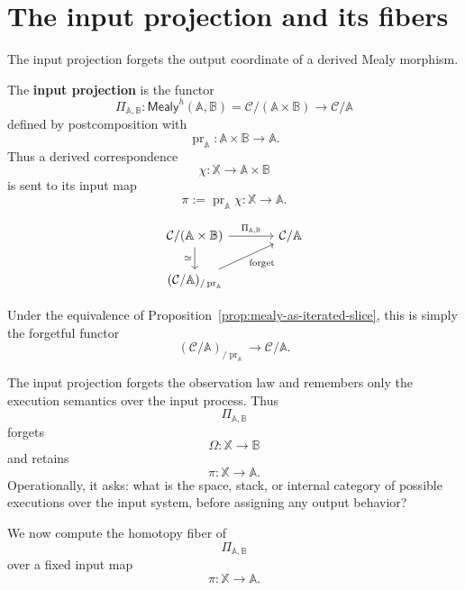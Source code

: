 \section{The input projection and its fibers}
\label{sec:input-projection-and-fiber-theorem-derived}

The input projection forgets the output coordinate of a derived Mealy
morphism.

\begin{definition}
\label{def:input-projection-derived-rewritten}
The \textbf{input projection} is the functor
\[
\Pi_{\mathbb A,\mathbb B}:
\mathsf{Mealy}^h(\mathbb A,\mathbb B)
=
\mathcal C/(\mathbb A\times\mathbb B)
\longrightarrow
\mathcal C/\mathbb A
\]
defined by postcomposition with
\[
\operatorname{pr}_{\mathbb A}:
\mathbb A\times\mathbb B\to\mathbb A.
\]
Thus a derived correspondence
\[
\chi:\mathbb X\to\mathbb A\times\mathbb B
\]
is sent to its input map
\[
\pi:=\operatorname{pr}_{\mathbb A}\chi:\mathbb X\to\mathbb A.
\]
\end{definition}

\[
\begin{tikzcd}[column sep=large]
\mathcal C/(\mathbb A\times\mathbb B)
\arrow[r, "\Pi_{\mathbb A,\mathbb B}"]
\arrow[d, "\simeq"']
&
\mathcal C/\mathbb A
\\
(\mathcal C/\mathbb A)_{/\operatorname{pr}_{\mathbb A}}
\arrow[ur, "\mathrm{forget}"']
&
\end{tikzcd}
\]

Under the equivalence of Proposition~\ref{prop:mealy-as-iterated-slice},
this is simply the forgetful functor
\[
(\mathcal C/\mathbb A)_{/\operatorname{pr}_{\mathbb A}}
\longrightarrow
\mathcal C/\mathbb A.
\]

\begin{remark}
\label{rem:input-projection-automata-interpretation}
The input projection forgets the observation law and remembers only the
execution semantics over the input process. Thus
\[
\Pi_{\mathbb A,\mathbb B}
\]
forgets
\[
\Omega:\mathbb X\to\mathbb B
\]
and retains
\[
\pi:\mathbb X\to\mathbb A.
\]
Operationally, it asks: what is the space, stack, or internal category
of possible executions over the input system, before assigning any
output behavior?
\end{remark}

We now compute the homotopy fiber of
\[
\Pi_{\mathbb A,\mathbb B}
\]
over a fixed input map
\[
\pi:\mathbb X\to\mathbb A.
\]

